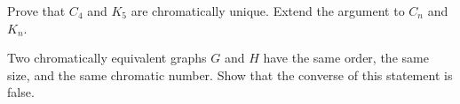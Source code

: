 \documentclass[twoside]{article}
\begin{document}
\newpage

\begin{ejercicio}{3.11}
 Prove that $C_4$ and $K_5$ are chromatically unique. Extend the argument to $C_n$ and $K_n$.
\end{ejercicio}
\begin{solucion}
\end{solucion}

\newpage

\begin{ejercicio}{3.12}
Two chromatically equivalent graphs $G$ and $H$ have the same order, the same size, and
the same chromatic number. Show that the converse of this statement is false.
\end{ejercicio}
\begin{solucion}
\end{solucion}
\end{document}
